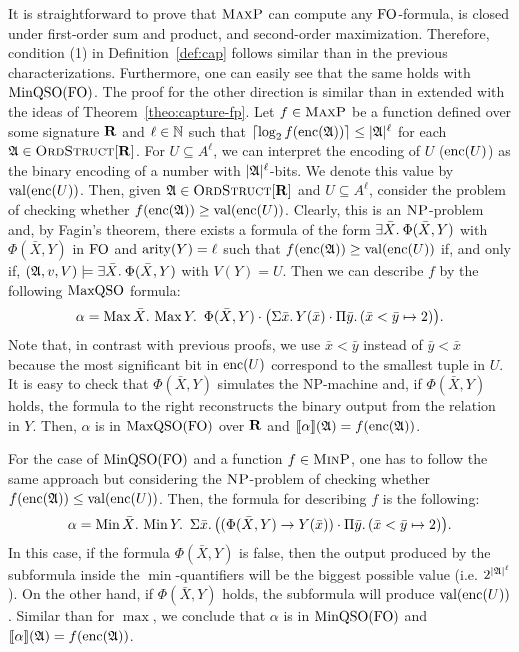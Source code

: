 It is straightforward to prove that $\text{\sc MaxP}$ can compute any ${\rm FO}$-formula, is closed under first-order sum and product, and second-order maximization. 
Therefore, condition (1) in Definition~\ref{def:cap} follows similar than in the previous characterizations. Furthermore, one can easily see that the same holds with ${\rm MinQSO}({\rm FO})$.
The proof for the other direction is similar than in \cite{kolaitis1994logical} extended with the ideas of Theorem~\ref{theo:capture-fp}. Let $f\in \text{\sc MaxP}$ be a function defined over some signature $\mathbf{R}$ and
$\ell\in\mathbb{N}$ such that $\lceil\log_2 f({\rm enc}(\mathfrak{A})) \rceil \leq |\mathfrak{A}|^\ell$ for each $\mathfrak{A}\in\text{\sc OrdStruct}[\mathbf{R}]$.
For $U \subseteq A^{\ell}$, we can interpret the encoding of $U$ (${\rm enc}(U)$) as the binary encoding of a number with $|\mathfrak{A}|^\ell$-bits. We denote this value by $\text{\rm val}({\rm enc}(U))$.
Then, given $\mathfrak{A}\in\text{\sc OrdStruct}[\mathbf{R}]$ and $U \subseteq A^{\ell}$, consider the problem of checking whether $f({\rm enc}(\mathfrak{A})) \geq \text{\rm val}({\rm enc}(U))$. 
Clearly, this is an $\text{\sc NP}$-problem and, by Fagin's theorem, there exists a formula of the form $\exists{\bar{X}}.\: \Phi(\bar{X}, Y)$ with $\Phi(\bar{X}, Y)$ in ${\rm FO}$ and ${\rm arity}(Y) = \ell$ such that $f({\rm enc}(\mathfrak{A})) \geq \text{\rm val}({\rm enc}(U))$ if, and only if, $(\mathfrak{A},v,V) \models \exists{\bar{X}}.\: \Phi(\bar{X}, Y)$ with $V(Y) = U$. 
Then we can describe $f$ by the following ${\rm MaxQSO}$ formula:
$$
\alpha = \maxa{\bar{X}} \maxa{Y} \ \Phi(\bar{X}, Y) \cdot \big( \sa{\bar{x}} Y(\bar{x}) \cdot \pa{\bar{y}}(\bar{x} < \bar{y} \mapsto 2) \big).
$$
Note that, in contrast with previous proofs, we use $\bar{x} < \bar{y}$ instead of $\bar{y} < \bar{x}$ because the most significant bit in ${\rm enc}(U)$ correspond to the smallest tuple in $U$.  
It is easy to check that $\Phi(\bar{X}, Y)$ simulates the NP-machine and, if $\Phi(\bar{X}, Y)$ holds, the formula to the right  reconstructs the binary output from the relation in $Y$.
Then, $\alpha$ is in ${\rm MaxQSO}({\rm FO})$ over $\mathbf{R}$ and ${\llbracket{}{\alpha}\rrbracket}(\mathfrak{A}) = f({\rm enc}(\mathfrak{A}))$. 

For the case of ${\rm MinQSO}({\rm FO})$ and a function $f \in \text{\sc MinP}$, one has to follow the same approach but considering the $\text{\sc NP}$-problem of checking whether $f({\rm enc}(\mathfrak{A})) \leq \text{\rm val}({\rm enc}(U))$. Then, the formula for describing $f$ is the following:
$$
\alpha = \operatorname{Min}{\bar{X}}.\, \operatorname{Min}{Y}.\, \ \Sigma{\bar{x}}.\, \big( (\Phi(\bar{X}, Y) \rightarrow Y(\bar{x})) \cdot \Pi{\bar{y}}.\,(\bar{x} < \bar{y} \mapsto 2)  \big).
$$
In this case, if the formula $\Phi(\bar{X}, Y)$ is false, then the output produced by the subformula inside the $\min$-quantifiers will be the biggest possible value (i.e. $2^{{|\mathfrak{A}|}^\ell}$).
On the other hand, if $\Phi(\bar{X}, Y)$ holds, the subformula will produce $\text{\rm val}({\rm enc}(U))$. 
Similar than for $\max$, we conclude that $\alpha$ is in ${\rm MinQSO}({\rm FO})$ and ${\llbracket{}{\alpha}\rrbracket}(\mathfrak{A}) = f({\rm enc}(\mathfrak{A}))$.